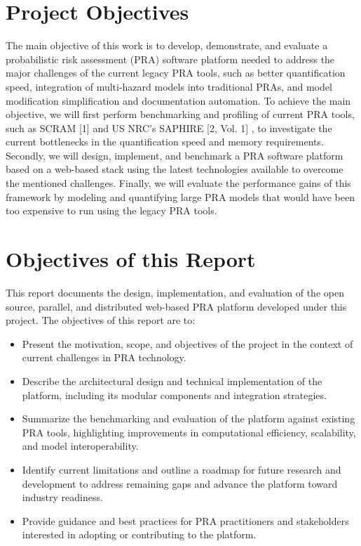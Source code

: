 \section{Project Objectives}
The main objective of this work is to develop, demonstrate, and evaluate a probabilistic risk assessment (PRA) software platform needed to address the major challenges of the current legacy PRA tools, such as better quantification speed, integration of multi-hazard models into traditional PRAs, and model modification simplification and documentation automation. To achieve the main objective, we will first perform benchmarking and profiling of current PRA tools, such as SCRAM [1] and US NRC's SAPHIRE [2, Vol. 1] , to investigate the current bottlenecks in the quantification speed and memory requirements. Secondly, we will design, implement, and benchmark a PRA software platform based on a web-based stack using the latest technologies available to overcome the mentioned challenges. Finally, we will evaluate the performance gains of this framework by modeling and quantifying large PRA models that would have been too expensive to run using the legacy PRA tools.

\section{Objectives of this Report}
This report documents the design, implementation, and evaluation of the open source, parallel, and distributed web-based PRA platform developed under this project. The objectives of this report are to:
\begin{itemize}
    \item Present the motivation, scope, and objectives of the project in the context of current challenges in PRA technology.
    \item Describe the architectural design and technical implementation of the platform, including its modular components and integration strategies.
    \item Summarize the benchmarking and evaluation of the platform against existing PRA tools, highlighting improvements in computational efficiency, scalability, and model interoperability.
    \item Identify current limitations and outline a roadmap for future research and development to address remaining gaps and advance the platform toward industry readiness.
    \item Provide guidance and best practices for PRA practitioners and stakeholders interested in adopting or contributing to the platform.
\end{itemize}





